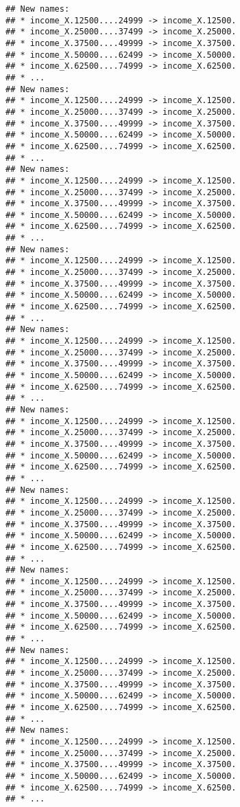 \documentclass[
]{article}
\begin{document}
\begin{verbatim}
## New names:
## * income_X.12500....24999 -> income_X.12500.
## * income_X.25000....37499 -> income_X.25000.
## * income_X.37500....49999 -> income_X.37500.
## * income_X.50000....62499 -> income_X.50000.
## * income_X.62500....74999 -> income_X.62500.
## * ...
## New names:
## * income_X.12500....24999 -> income_X.12500.
## * income_X.25000....37499 -> income_X.25000.
## * income_X.37500....49999 -> income_X.37500.
## * income_X.50000....62499 -> income_X.50000.
## * income_X.62500....74999 -> income_X.62500.
## * ...
## New names:
## * income_X.12500....24999 -> income_X.12500.
## * income_X.25000....37499 -> income_X.25000.
## * income_X.37500....49999 -> income_X.37500.
## * income_X.50000....62499 -> income_X.50000.
## * income_X.62500....74999 -> income_X.62500.
## * ...
## New names:
## * income_X.12500....24999 -> income_X.12500.
## * income_X.25000....37499 -> income_X.25000.
## * income_X.37500....49999 -> income_X.37500.
## * income_X.50000....62499 -> income_X.50000.
## * income_X.62500....74999 -> income_X.62500.
## * ...
## New names:
## * income_X.12500....24999 -> income_X.12500.
## * income_X.25000....37499 -> income_X.25000.
## * income_X.37500....49999 -> income_X.37500.
## * income_X.50000....62499 -> income_X.50000.
## * income_X.62500....74999 -> income_X.62500.
## * ...
## New names:
## * income_X.12500....24999 -> income_X.12500.
## * income_X.25000....37499 -> income_X.25000.
## * income_X.37500....49999 -> income_X.37500.
## * income_X.50000....62499 -> income_X.50000.
## * income_X.62500....74999 -> income_X.62500.
## * ...
## New names:
## * income_X.12500....24999 -> income_X.12500.
## * income_X.25000....37499 -> income_X.25000.
## * income_X.37500....49999 -> income_X.37500.
## * income_X.50000....62499 -> income_X.50000.
## * income_X.62500....74999 -> income_X.62500.
## * ...
## New names:
## * income_X.12500....24999 -> income_X.12500.
## * income_X.25000....37499 -> income_X.25000.
## * income_X.37500....49999 -> income_X.37500.
## * income_X.50000....62499 -> income_X.50000.
## * income_X.62500....74999 -> income_X.62500.
## * ...
## New names:
## * income_X.12500....24999 -> income_X.12500.
## * income_X.25000....37499 -> income_X.25000.
## * income_X.37500....49999 -> income_X.37500.
## * income_X.50000....62499 -> income_X.50000.
## * income_X.62500....74999 -> income_X.62500.
## * ...
## New names:
## * income_X.12500....24999 -> income_X.12500.
## * income_X.25000....37499 -> income_X.25000.
## * income_X.37500....49999 -> income_X.37500.
## * income_X.50000....62499 -> income_X.50000.
## * income_X.62500....74999 -> income_X.62500.
## * ...
\end{verbatim}
\end{document}
